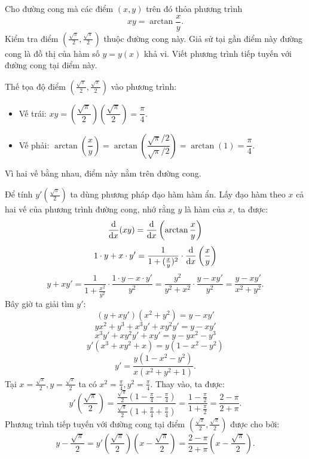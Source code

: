 \begin{example}
    Cho đường cong mà các điểm $(x, y)$ trên đó thỏa phương trình
    \[ xy = \arctan\dfrac{x}{y}. \]
    Kiểm tra điểm $(\frac{\sqrt{\pi}}{2}, \frac{\sqrt{\pi}}{2})$ thuộc đường cong này. Giả sử tại gần điểm này đường cong là đồ thị của hàm số $y=y(x)$ khả vi. Viết phương trình tiếp tuyến với đường cong tại điểm này.

    \begin{solution}
        Thế tọa độ điểm $(\frac{\sqrt{\pi}}{2}, \frac{\sqrt{\pi}}{2})$ vào phương trình:
        \begin{itemize}
            \item Vế trái: $xy = \left(\dfrac{\sqrt{\pi}}{2}\right)\left(\dfrac{\sqrt{\pi}}{2}\right) = \dfrac{\pi}{4}$.
            \item Vế phải: $\arctan\left(\dfrac{x}{y}\right) = \arctan\left(\dfrac{\sqrt{\pi}/2}{\sqrt{\pi}/2}\right) = \arctan(1) = \dfrac{\pi}{4}$.
        \end{itemize}
        Vì hai vế bằng nhau, điểm này nằm trên đường cong.

        Để tính $y'(\frac{\sqrt{\pi}}{2})$ ta dùng phương pháp đạo hàm hàm ẩn. Lấy đạo hàm theo $x$ cả hai vế của phương trình đường cong, nhớ rằng $y$ là hàm của $x$, ta được:
        \[ \frac{\mathrm{d}}{\mathrm{d}x}(xy) = \frac{\mathrm{d}}{\mathrm{d}x}\left(\arctan\dfrac{x}{y}\right) \]
        \[ 1 \cdot y + x \cdot y' = \dfrac{1}{1 + (\frac{x}{y})^2} \cdot \frac{\mathrm{d}}{\mathrm{d}x}\left(\dfrac{x}{y}\right) \]
        \[ y + xy' = \dfrac{1}{1 + \frac{x^2}{y^2}} \cdot \dfrac{1 \cdot y - x \cdot y'}{y^2} = \dfrac{y^2}{y^2+x^2} \cdot \dfrac{y - xy'}{y^2} = \dfrac{y-xy'}{x^2+y^2}. \]
        Bây giờ ta giải tìm $y'$:
        \[ (y + xy')(x^2+y^2) = y - xy' \]
        \[ yx^2 + y^3 + x^3y' + xy^2y' = y - xy' \]
        \[ x^3y' + xy^2y' + xy' = y - yx^2 - y^3 \]
        \[ y'(x^3 + xy^2 + x) = y(1 - x^2 - y^2) \]
        \[ y' = \dfrac{y(1-x^2-y^2)}{x(x^2+y^2+1)}. \]
        Tại $x=\frac{\sqrt{\pi}}{2}, y=\frac{\sqrt{\pi}}{2}$ ta có $x^2 = \frac{\pi}{4}, y^2 = \frac{\pi}{4}$. Thay vào, ta được:
        \[ y'\left(\frac{\sqrt{\pi}}{2}\right) = \dfrac{\frac{\sqrt{\pi}}{2}(1-\frac{\pi}{4}-\frac{\pi}{4})}{\frac{\sqrt{\pi}}{2}(1+\frac{\pi}{4}+\frac{\pi}{4})} = \dfrac{1-\frac{\pi}{2}}{1+\frac{\pi}{2}} = \dfrac{2-\pi}{2+\pi}. \]
        Phương trình tiếp tuyến với đường cong tại điểm $(\frac{\sqrt{\pi}}{2}, \frac{\sqrt{\pi}}{2})$ được cho bởi:
        \[ y - \dfrac{\sqrt{\pi}}{2} = y'\left(\dfrac{\sqrt{\pi}}{2}\right) \left(x - \dfrac{\sqrt{\pi}}{2}\right) = \dfrac{2-\pi}{2+\pi}\left(x-\dfrac{\sqrt{\pi}}{2}\right). \]
    \end{solution}
\end{example}

